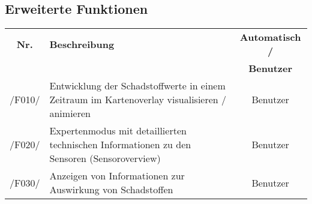 \subsection{Erweiterte Funktionen}
\begin{tabularx}{\textwidth}{| c | X | c |}
\hline
        \textbf{Nr.} & 
        \textbf{Beschreibung} & 
        \textbf{Automatisch /} \\
        & & \textbf{Benutzer} \\
        \hline
        /F010/ & Entwicklung der Schadstoffwerte in einem Zeitraum im Kartenoverlay visualisieren / animieren & Benutzer \\
        \hline
        /F020/ & Expertenmodus mit detaillierten technischen Informationen zu den Sensoren (Sensoroverview) & Benutzer \\
        \hline
        /F030/ & Anzeigen von Informationen zur Auswirkung von Schadstoffen & Benutzer \\
        \hline
\end{tabularx}